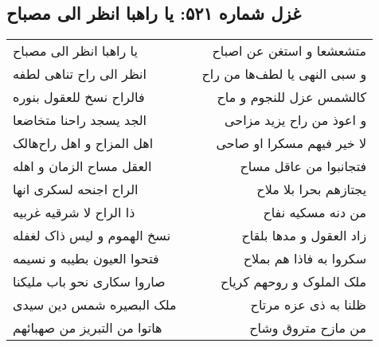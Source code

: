 \begin{center}
\section*{غزل شماره ۵۲۱: یا راهبا انظر الی مصباح}
\label{sec:0521}
\begin{longtable}{l p{0.5cm} r}
یا راهبا انظر الی مصباح
&&
متشعشعا و استغن عن اصباح
\\
انظر الی راح تناهی لطفه
&&
و سبی النهی یا لطف‌ها من راح
\\
فالراح نسخ للعقول بنوره
&&
کالشمس عزل للنجوم و ماح
\\
الجد یسجد راحنا متخاضعا
&&
و اعوذ من راح یزید مزاحی
\\
اهل المزاح و اهل راح‌هالک
&&
لا خیر فیهم مسکرا او صاحی
\\
العقل مساح الزمان و اهله
&&
فتجانبوا من عاقل مساح
\\
الراح اجنحه لسکری انها
&&
یجتازهم بحرا بلا ملاح
\\
ذا الراح لا شرقیه غربیه
&&
من دنه مسکیه نفاح
\\
نسخ الهموم و لیس ذاک لغفله
&&
زاد العقول و مدها بلقاح
\\
فتحوا العیون بطیبه و نسیمه
&&
سکروا به فاذا هم بملاح
\\
صاروا سکاری نحو باب ملیکنا
&&
ملک الملوک و روحهم کریاح
\\
ملک البصیره شمس دین سیدی
&&
ظلنا به ذی عزه مرتاح
\\
هاتوا من التبریز من صهبائهم
&&
من مازح متروق وشاح
\\
\end{longtable}
\end{center}
